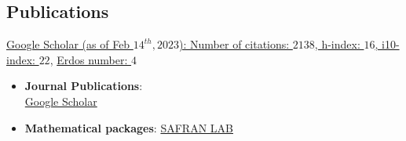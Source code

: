 \documentclass[margin,line]{resume}
\begin{document}
\begin{resume}
	\section{\mysidestyle Publications}
	\href{https://scholar.google.co.in/citations?user=h2hgRJoAAAAJ&hl=en}{Google Scholar (as of Feb $14^{th}, 2023$): Number of citations: $2138$, h-index: $16$, i10-index: $22$}, \href{http://www.ams.org/mathscinet/collaborationDistance.html}{Erdos number: $4$}
	\begin{itemize}
	\item
	\textbf{Journal Publications}:\\
	\href{https://scholar.google.co.in/citations?user=h2hgRJoAAAAJ&hl=en}{Google Scholar}
	\item
	\textbf{Mathematical packages}:
	\href{https://github.com/orgs/SAFRAN-LAB/repositories}{SAFRAN LAB}
	\end{itemize}

	

\end{resume}
\end{document}
